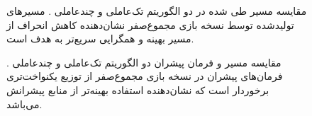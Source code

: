 \begin{figure}[H]
	\centering
	
	
	\caption{
		مقایسه مسیر طی شده در دو الگوریتم تک‌عاملی و چندعاملی .
		مسیرهای تولیدشده توسط نسخه بازی مجموع‌صفر نشان‌دهنده کاهش انحراف از مسیر بهینه و همگرایی سریع‌تر به هدف است.
	}
\end{figure}


\begin{figure}[H]
	\centering
	
	
	\caption{
		مقایسه مسیر و فرمان پیشران دو الگوریتم تک‌عاملی و چندعاملی .
		فرمان‌های پیشران در نسخه بازی مجموع‌صفر از توزیع یکنواخت‌تری برخوردار است که نشان‌دهنده استفاده بهینه‌تر از منابع پیشرانش می‌باشد.
	}
\end{figure}

